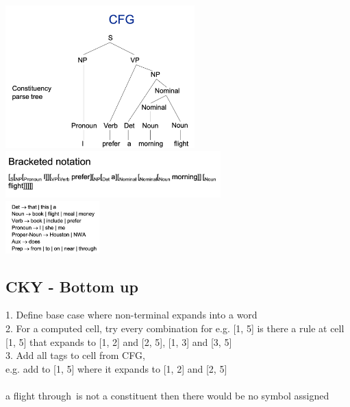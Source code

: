 \documentclass[11pt]{article}
\begin{document}
\begin{multicols*}{4}
\includegraphics[height=5.5cm]{images/w4}\\
\includegraphics[height=1.8cm]{images/w5}\\
\includegraphics[height=2cm]{images/w6}
\subsection*{CKY - Bottom up}
1. Define base case where non-terminal expands into a word\\
2. For a computed cell, try every combination for e.g. [1, 5] is there a rule at cell [1, 5] that expands to [1, 2] and [2, 5], [1, 3] and [3, 5]\\
3. Add all tags to cell from CFG,\\ e.g. add to [1, 5] where it expands to [1, 2] and [2, 5] \\
\\ 
\textquotesingle a flight through\textquotesingle\ is not a constituent then there would be no symbol assigned

\end{multicols*}
\end{document}
